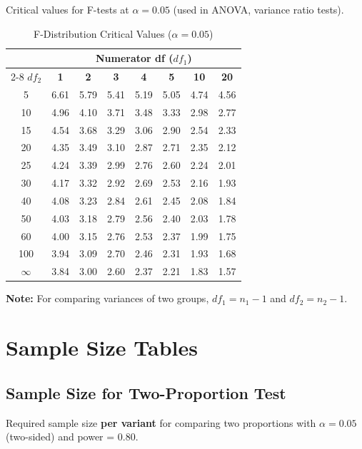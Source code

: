Critical values for F-tests at $\alpha = 0.05$ (used in ANOVA, variance ratio tests).

\begin{table}[h]
\centering
\caption{F-Distribution Critical Values ($\alpha = 0.05$)}
\begin{tabular}{c|ccccccc}
\toprule
& \multicolumn{7}{c}{\textbf{Numerator df ($df_1$)}} \\
\cmidrule{2-8}
\textbf{$df_2$} & \textbf{1} & \textbf{2} & \textbf{3} & \textbf{4} & \textbf{5} & \textbf{10} & \textbf{20} \\
\midrule
5 & 6.61 & 5.79 & 5.41 & 5.19 & 5.05 & 4.74 & 4.56 \\
10 & 4.96 & 4.10 & 3.71 & 3.48 & 3.33 & 2.98 & 2.77 \\
15 & 4.54 & 3.68 & 3.29 & 3.06 & 2.90 & 2.54 & 2.33 \\
20 & 4.35 & 3.49 & 3.10 & 2.87 & 2.71 & 2.35 & 2.12 \\
25 & 4.24 & 3.39 & 2.99 & 2.76 & 2.60 & 2.24 & 2.01 \\
30 & 4.17 & 3.32 & 2.92 & 2.69 & 2.53 & 2.16 & 1.93 \\
40 & 4.08 & 3.23 & 2.84 & 2.61 & 2.45 & 2.08 & 1.84 \\
50 & 4.03 & 3.18 & 2.79 & 2.56 & 2.40 & 2.03 & 1.78 \\
60 & 4.00 & 3.15 & 2.76 & 2.53 & 2.37 & 1.99 & 1.75 \\
100 & 3.94 & 3.09 & 2.70 & 2.46 & 2.31 & 1.93 & 1.68 \\
$\infty$ & 3.84 & 3.00 & 2.60 & 2.37 & 2.21 & 1.83 & 1.57 \\
\bottomrule
\end{tabular}
\end{table}

\textbf{Note:} For comparing variances of two groups, $df_1 = n_1 - 1$ and $df_2 = n_2 - 1$.

\newpage

\section{Sample Size Tables}

\subsection{Sample Size for Two-Proportion Test}

Required sample size \textbf{per variant} for comparing two proportions with $\alpha = 0.05$ (two-sided) and power = 0.80.


